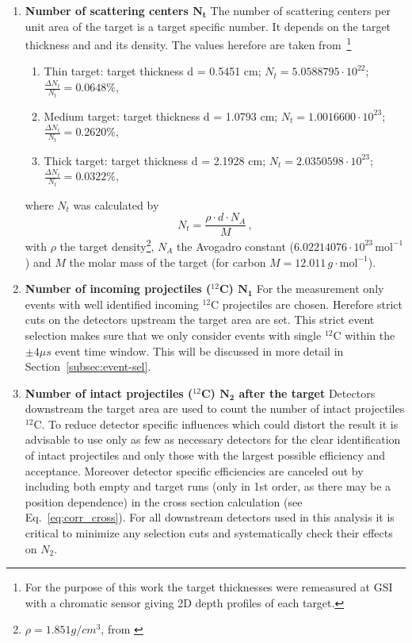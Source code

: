 \begin{enumerate}
\item[$\blacksquare$] \textbf{Number of scattering centers $\mathbf{N_t}$}\newline
The number of scattering centers per unit area of the target is a target specific number. It depends on the target thickness and and its density. The values herefore are taken from~\cite{ponnath2023precise}\footnote{For the purpose of this work the target thicknesses were remeasured at GSI with a chromatic sensor giving 2D depth profiles of each target.}
\begin{enumerate}
\item Thin target:\newline 
target thickness d = 0.5451 cm; $N_t = 5.0588795\cdot 10^{22}$; $\frac{\Delta N_t}{N_t} = 0.0648\%$,
\item Medium target:\newline
target thickness d = 1.0793 cm; $N_t = 1.0016600\cdot 10^{23}$; $\frac{\Delta N_t}{N_t} = 0.2620\%$,
\item Thick target:\newline
target thickness d = 2.1928 cm; $N_t = 2.0350598\cdot 10^{23}$; $\frac{\Delta N_t}{N_t} = 0.0322\%$,
\end{enumerate} 
where $N_t$ was calculated by
\begin{equation}
N_t = \frac{\rho \cdot d \cdot N_A}{M} \, ,
\end{equation}
with $\rho$ the target density\footnote{$\rho = 1.851 g/cm^{3}$, from \cite{ponnath2023precise}}, $N_A$ the Avogadro constant ($6.02214076\cdot10^{23}\,\text{mol}^{-1}$) and $M$ the molar mass of the target (for carbon $M = 12.011\,g \cdot \text{mol}^{-1}$).
\item[$\blacksquare$] \textbf{Number of incoming projectiles ($^{12}$C) $\mathbf{N_1}$}\newline
For the measurement only events with well identified incoming $^{12}$C projectiles are chosen. Herefore strict cuts on the detectors upstream the target area are set. This strict event selection makes sure that we only consider events with single $^{12}$C within the $\pm 4\mu s$ event time window. This will be discussed in more detail in Section~\ref{subsec:event-sel}. 
\item[$\blacksquare$] \textbf{Number of intact projectiles ($^{12}$C) $\mathbf{N_2}$ after the target}\newline
Detectors downstream the target area are used to count the number of intact projectiles $^{12}$C. To reduce detector specific influences which could distort the result it is advisable to use only as few as necessary detectors for the clear identification of intact projectiles and only those with the largest possible efficiency and acceptance. Moreover detector specific efficiencies are canceled out by including both empty and target runs (only in 1st order, as there may be a position dependence) in the cross section calculation (see Eq.~\ref{eq:corr_cross}). For all downstream detectors used in this analysis it is critical to minimize any selection cuts and systematically check their effects on $N_2$.
\end{enumerate}
